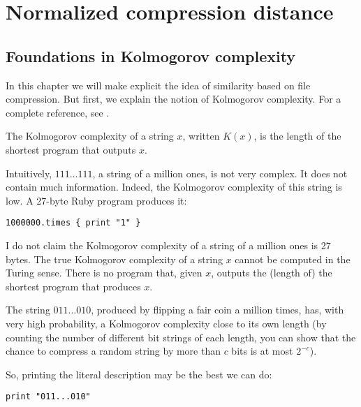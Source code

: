 
\chapter{Normalized compression distance} %

\label{Chapter2} %


\section{Foundations in Kolmogorov complexity}

In this chapter we will make explicit the idea of similarity based on file compression. But first, we explain the notion of Kolmogorov complexity. For a complete reference, see \cite{li2009introduction}.

The Kolmogorov complexity of a string $x$, written $K(x)$, is the length of the shortest program that outputs $x$.

Intuitively, $111\dots111$, a string of a million ones, is not very complex. It does not contain much information. Indeed, the Kolmogorov complexity of this string is low. A 27-byte Ruby program produces it:

\begin{verbatim}
1000000.times { print "1" }
\end{verbatim}

I do not claim the Kolmogorov complexity of a string of a million ones is 27 bytes. The true Kolmogorov complexity of a string $x$ cannot be computed in the Turing sense. There is no program that, given $x$, outputs the (length of) the shortest program that produces $x$.

The string $011\dots010$, produced by flipping a fair coin a million times, has, with very high probability, a Kolmogorov complexity close to its own length (by counting the number of different bit strings of each length, you can show that the chance to compress a random string by more than $c$ bits is at most $2^{-c}$).

So, printing the literal description may be the best we can do:

\begin{verbatim}
print "011...010"
\end{verbatim}

